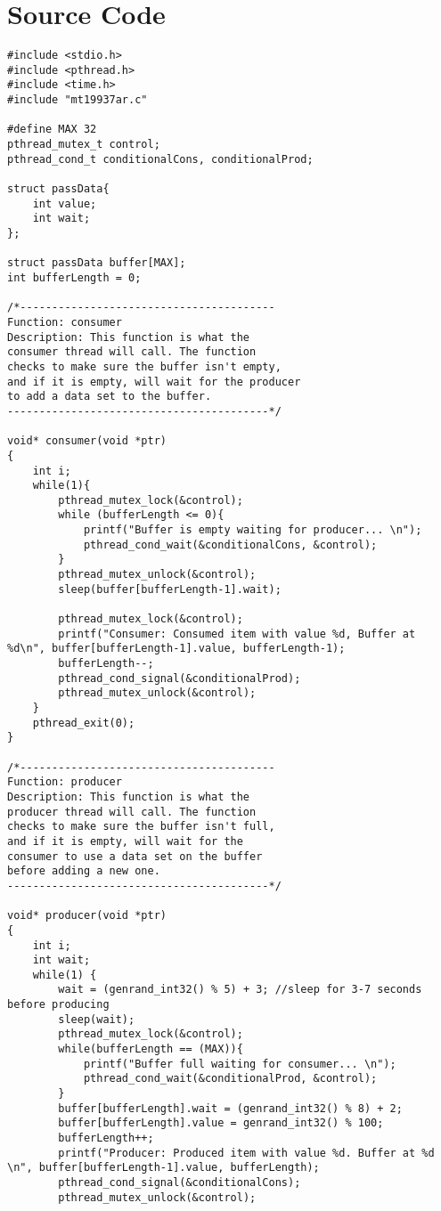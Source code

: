 \documentclass[letterpaper,10pt,titlepage,draftclsnofoot,onecolumn]{IEEEtran}
\begin{document}
\section{Source Code}
\begin{lstlisting}
#include <stdio.h>
#include <pthread.h>
#include <time.h>
#include "mt19937ar.c"

#define MAX 32       
pthread_mutex_t control;
pthread_cond_t conditionalCons, conditionalProd;

struct passData{
	int value;
	int wait;
};	

struct passData buffer[MAX];
int bufferLength = 0;

/*----------------------------------------
Function: consumer
Description: This function is what the 
consumer thread will call. The function
checks to make sure the buffer isn't empty,
and if it is empty, will wait for the producer 
to add a data set to the buffer.
-----------------------------------------*/

void* consumer(void *ptr) 
{
	int i;
	while(1){
		pthread_mutex_lock(&control);
		while (bufferLength <= 0){
			printf("Buffer is empty waiting for producer... \n");
			pthread_cond_wait(&conditionalCons, &control);
		}
		pthread_mutex_unlock(&control);	
		sleep(buffer[bufferLength-1].wait);

		pthread_mutex_lock(&control); 
		printf("Consumer: Consumed item with value %d, Buffer at %d\n", buffer[bufferLength-1].value, bufferLength-1);
		bufferLength--;
		pthread_cond_signal(&conditionalProd);
		pthread_mutex_unlock(&control); 
	}
	pthread_exit(0);
}

/*----------------------------------------
Function: producer
Description: This function is what the 
producer thread will call. The function
checks to make sure the buffer isn't full,
and if it is empty, will wait for the  
consumer to use a data set on the buffer
before adding a new one. 
-----------------------------------------*/

void* producer(void *ptr) 
{
	int i;
	int wait;  
	while(1) {
		wait = (genrand_int32() % 5) + 3; //sleep for 3-7 seconds before producing
		sleep(wait);
		pthread_mutex_lock(&control);
		while(bufferLength == (MAX)){
			printf("Buffer full waiting for consumer... \n");
			pthread_cond_wait(&conditionalProd, &control);	
		}	
		buffer[bufferLength].wait = (genrand_int32() % 8) + 2; 
		buffer[bufferLength].value = genrand_int32() % 100;  
		bufferLength++;
		printf("Producer: Produced item with value %d. Buffer at %d \n", buffer[bufferLength-1].value, bufferLength);
		pthread_cond_signal(&conditionalCons); 
		pthread_mutex_unlock(&control); 


\end{lstlisting}
\end{document}

